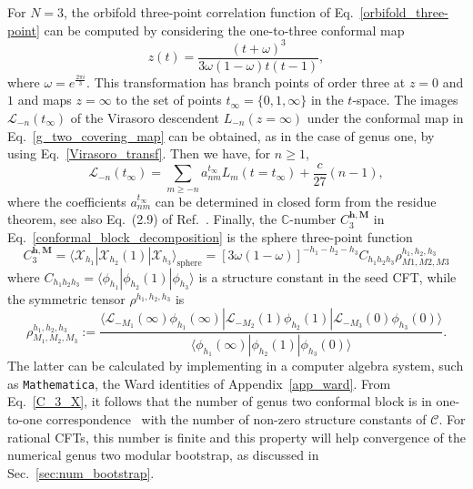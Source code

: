 \documentclass[a4paper,11pt]{article}
\begin{document}
For $N=3$, the orbifold three-point correlation 
function of Eq.~\eqref{orbifold_three-point} can be computed 
by considering the one-to-three conformal map~\cite{Collier}
\begin{equation}\label{g_two_covering_map}
 z(t)=\frac{(t+\omega)^3}{3\omega(1-\omega)t(t-1)},
\end{equation}
where $\omega=e^{\frac{2\pi i}{3}}$. This transformation has branch points of order three at 
$z=0$ and $1$ and maps $z=\infty$  to the set of points 
$t_{\infty}=\{0, 1, \infty\}$ in the $t$-space.
The images $\mathcal{L}_{-n}(t_{\infty})$ of the Virasoro descendent $L_{-n}(z=\infty)$ 
under the conformal map in Eq.~\eqref{g_two_covering_map} can be obtained, as in the 
case of genus one, by using Eq.~\eqref{Virasoro_transf}.
Then we have, for $n\geq 1$,
\begin{equation}
 \mathcal{L}_{-n}(t_{\infty})=\sum_{m\geq -n} a_{nm}^{t_{\infty}}L_m(t=t_\infty)+\frac{c}{27}(n-1),
\end{equation}
where the coefficients $a_{nm}^{t_{\infty}}$ can be determined in closed form from the residue theorem, see also Eq.~(2.9)
of Ref.~\cite{Collier}. Finally, the $\mathbb{C}$-number $C_3^{\boldsymbol{h},\boldsymbol{M}}$ in Eq.~\eqref{conformal_block_decomposition} is the sphere three-point function
\begin{equation}\label{C_3_X}
 C_3^{\boldsymbol{h},\boldsymbol{M}}=\langle \mathcal{X}_{h_1}|\mathcal{X}_{h_2}(1)|\mathcal{X}_{h_3}\rangle_{\text{sphere}} 
 =[3\omega(1-\omega)]^{-h_1-h_2-h_3}C_{h_1h_2h_3}\rho_{M1,M2,M3}^{h_1,h_2,h_3}
\end{equation}
where $C_{h_1 h_2 h_3}=\langle \phi_{h_1}|\phi_{h_2}(1)|\phi_{h_3}\rangle$ is a structure constant in the seed CFT, while the symmetric tensor $\rho^{h_1,h_2,h_3}$ is 
\begin{equation}
 \rho^{h_1,h_2,h_3}_{M_1,M_2,M_3}:=
 \frac{\langle \boldsymbol{\mathcal{L}}_{-M_1}(\infty)\phi_{h_1}(\infty)|\boldsymbol{\mathcal{L}}_{-M_2}(1)\phi_{h_2}(1)|\boldsymbol{\mathcal{L}}_{-M_3}(0)\phi_{h_3}(0)\rangle}
 { \langle \phi_{h_1}(\infty)|\phi_{h_2}(1)|\phi_{h_3}(0)\rangle}.
\end{equation}
The latter can be calculated by implementing in a computer algebra system, such as \texttt{Mathematica}, the Ward identities of Appendix~\ref{app_ward}.
From Eq.~\eqref{C_3_X}, it follows that the number of genus two conformal block is in one-to-one correspondence~\cite{Cardy, Collier} with the number of non-zero structure constants of $\mathcal{C}$. For rational CFTs, this number is finite and this property will help convergence of the numerical genus two modular bootstrap, as  discussed in Sec.~\ref{sec:num_bootstrap}.
\end{document}
